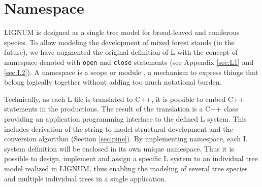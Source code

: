 \section{Namespace}\label{sec:namespace}  

LIGNUM  is  designed as  a  single  tree  model for  broad-leaved  and
coniferous species.  To allow modeling the development of mixed forest
stands (in the future), we have augmented the original definition of L
with  the   concept  of  namespace  denoted   with  \texttt{open}  and
\texttt{close}    statements    (see    Appendix   \ref{sec:L1}    and
\ref{sec:L2}).     A    namespace     is    a    scope    or    module
\citep{stroustrup:97},  a  mechanism to  express  things that  belong
logically together without adding too much notational burden.
 
Technically, as  each L file is  translated to C++, it  is possible to
embed C++ statements in the productions. The result of the translation
is a C++  class providing an application programming  interface to the
defined L  system.  This  includes derivation of  the string  to model
structural   development  and   the   conversion  algorithm   (Section
\ref{sec:pine}).  By implementing  namespace, each L system definition
will be enclosed  in its own unique namespace. Thus  it is possible to
design, implement and assign a specific L system to an individual tree
model realized in  LIGNUM, thus enabling the modeling  of several tree
species and multiple individual trees in a single application.

